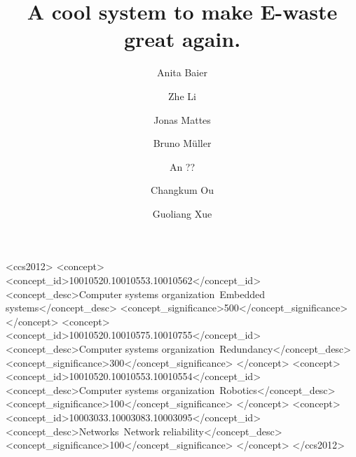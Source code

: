 \documentclass[sigchi-a, authorversion]{acmart}
\begin{document}
\title{A cool system to make E-waste great again.}

\author{Anita Baier}

\author{Zhe Li}

\author{Jonas Mattes}

\author{Bruno M\"uller}

\author{An ??}

\author{Changkum Ou}

\author{Guoliang Xue}

\renewcommand{\shortauthors}{F. Author et al.}


%
%
\begin{CCSXML}
<ccs2012>
 <concept>
  <concept_id>10010520.10010553.10010562</concept_id>
  <concept_desc>Computer systems organization~Embedded systems</concept_desc>
  <concept_significance>500</concept_significance>
 </concept>
 <concept>
  <concept_id>10010520.10010575.10010755</concept_id>
  <concept_desc>Computer systems organization~Redundancy</concept_desc>
  <concept_significance>300</concept_significance>
 </concept>
 <concept>
  <concept_id>10010520.10010553.10010554</concept_id>
  <concept_desc>Computer systems organization~Robotics</concept_desc>
  <concept_significance>100</concept_significance>
 </concept>
 <concept>
  <concept_id>10003033.10003083.10003095</concept_id>
  <concept_desc>Networks~Network reliability</concept_desc>
  <concept_significance>100</concept_significance>
 </concept>
</ccs2012>  
\end{CCSXML}
\end{document}
